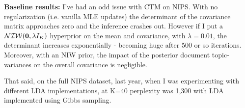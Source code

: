 %
%



{\color{red}
{\bf Baseline results:}
I've had an odd issue with CTM on NIPS. With no regularization (i.e. vanilla MLE updates) the determinant of the covariance matrix approaches zero and the inference crashes out. However if I put a $\mathcal{NIW}(\bm 0, \lambda I_K)$ hyperprior on the mean and covariance,  with $\lambda=0.01$, the determinant increases exponentially - becoming huge after 500 or so iterations. Moreover, with an NIW prior, the impact of the posterior document topic-variances on the overall covariance is negligible.

That said, on the full NIPS dataset, last year, when I was experimenting with different LDA implementations, at K=40 perplexity was 1,300 with LDA implemented using Gibbs sampling.
}

